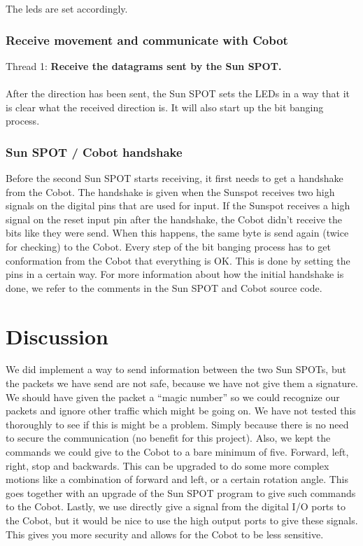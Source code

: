 \documentclass[a4paper,10pt]{article} %
\begin{document}


\noindent The leds are set accordingly.

\subsubsection{Receive movement and communicate with Cobot} %

\noindent Thread 1: \textbf{Receive the datagrams sent by the Sun SPOT.}
\\
\\
After the direction has been sent, the Sun SPOT sets the LEDs in a way that
it is clear what the received direction is. It will also start up the bit
banging process.


\subsubsection{Sun SPOT / Cobot handshake} %
\label{ssub:Sun SPOT / Cobot handshake}

Before the second Sun SPOT starts receiving, it first needs to get a handshake
from the Cobot. The handshake is given when the Sunspot receives two high
signals on the digital pins that are used for input. If the Sunspot receives a
high signal on the reset input pin after the handshake, the Cobot didn't receive
the bits like they were send. When this happens, the same byte is send again
(twice for checking) to the Cobot. Every step of the bit banging process has to
get conformation from the Cobot that everything is OK. This is done by setting
the pins in a certain way. For more information about how the initial handshake
is done, we refer to the comments in the Sun SPOT and Cobot source code.



\section{Discussion} %

We did implement a way to send information between the two Sun SPOTs, but the
packets we have send are not safe, because we have not give them a signature.
We should have given the packet a ``magic number'' so we could recognize our
packets and ignore other traffic which might be going on. We have not tested
this thoroughly to see if this is might be a problem. Simply because there is no
need to secure the communication (no benefit for this project). Also, we kept
the commands we could give to the Cobot to a bare minimum of five. Forward,
left, right, stop and backwards. This can be upgraded to do some more complex
motions like a combination of forward and left, or a certain rotation angle.
This goes together with an upgrade of the Sun SPOT program to give such 
commands to the Cobot. 
Lastly, we use directly give a signal from the digital I/O ports to the 
Cobot, but it would be nice to use the high output ports to give these signals.
This gives you more security and allows for the Cobot to be less sensitive.
\end{document}
